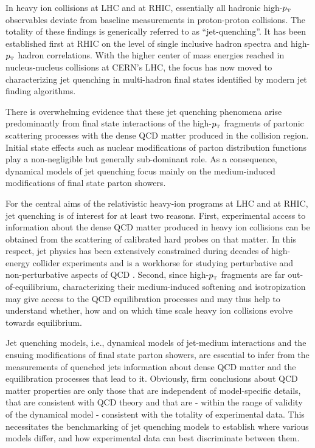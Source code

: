 In heavy ion collisions at LHC and at RHIC, essentially all hadronic high-$p_{\text{\tiny T}}$ observables deviate from baseline measurements in proton-proton collisions. The totality of these findings is generically referred to as ``jet-quenching''. It has been established first at RHIC on the level of single inclusive hadron spectra and high-$p_{\text{\tiny T}}$ hadron correlations. With the higher center of mass energies reached in nucleus-nucleus collisions at CERN's LHC, the focus has now moved to characterizing jet quenching in multi-hadron final states identified by modern jet finding algorithms.

There is overwhelming evidence that these jet quenching phenomena arise predominantly from final state interactions of the high-$p_{\text{\tiny T}}$ fragments of partonic scattering processes with the dense QCD matter produced in the collision region. Initial state effects such as nuclear modifications of parton distribution functions play a non-negligible but generally sub-dominant role. As a consequence, dynamical models of jet quenching focus mainly on the medium-induced modifications of final state parton showers. 

For the central aims of the relativistic heavy-ion programs at LHC and at RHIC, jet quenching is of interest for at least two reasons. First, experimental access to information about the dense QCD matter produced in heavy ion collisions can be obtained from the scattering of calibrated hard probes on that matter. 
In this respect, jet physics has been extensively constrained during decades of high-energy collider experiments and is a workhorse for studying perturbative and non-perturbative aspects of QCD \cite{Ellis:1991qj}.
Second, since high-$p_{\text{\tiny T}}$ fragments are far out-of-equilibrium, characterizing their medium-induced softening and isotropization may give access to the QCD equilibration processes and may thus help to understand whether, how and on which time scale heavy ion collisions evolve towards equilibrium. 

Jet quenching models, i.e., dynamical models of jet-medium interactions and the ensuing modifications of final state parton showers, are essential to 
infer from the measurements of quenched jets information about dense QCD matter and the equilibration processes that lead to it. Obviously, firm 
conclusions about QCD matter properties are only those that are independent of model-specific details, that are consistent with QCD theory and that are - within the range of validity of the dynamical model - consistent with the totality of experimental data. This necessitates the benchmarking of jet quenching models to establish where various models differ, and how experimental data can best discriminate between them.

